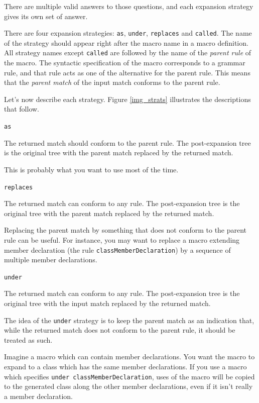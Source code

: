 There are multiple valid answers to those questions, and each expansion strategy
gives its own set of answer.

There are four expansion strategies: \texttt{as}, \texttt{under},
\texttt{replaces} and \texttt{called}. The name of the strategy should appear
right after the macro name in a macro definition. All strategy names except
\texttt{called} are followed by the name of the \emph{parent rule} of the
macro. The syntactic specification of the macro corresponds to a grammar rule,
and that rule acts as one of the alternative for the parent rule. This means
that the \emph{parent match} of the input match conforms to the parent rule.

Let's now describe each strategy. Figure \ref{img_strats} illustrates the
descriptions that follow.

\begin{description}
\item \texttt{as}

  The returned match should conform to the parent rule. The post-expansion tree
  is the original tree with the parent match replaced by the returned match.

  This is probably what you want to use most of the time.

\item \texttt{replaces}

  The returned match can conform to any rule. The post-expansion tree is the
  original tree with the parent match replaced by the returned match.

  Replacing the parent match by something that does not conform to the parent
  rule can be useful. For instance, you may want to replace a macro extending
  member declaration (the rule \texttt{classMemberDeclaration}) by a sequence of
  multiple member declarations.

\item \texttt{under}

  The returned match can conform to any rule. The post-expansion tree is the
  original tree with the input match replaced by the returned match.

  The idea of the \texttt{under} strategy is to keep the parent match as an
  indication that, while the returned match does not conform to the parent
  rule, it should be treated as such.

  Imagine a macro which can contain member declarations. You want the macro to
  expand to a class which has the same member declarations. If you use a macro
  which specifies \texttt{under classMemberDeclaration}, uses of the macro will
  be copied to the generated class along the other member declarations, even if
  it isn't really a member declaration.


\end{description}
